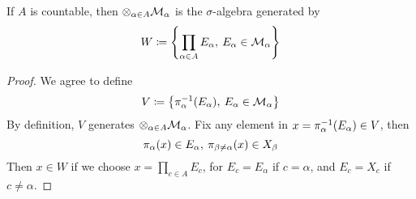 \documentclass[../../main.tex]{subfiles}
\begin{document}
\begin{wts}
    If $A$ is countable, then $\otimes_{\alpha\in A}\cal{M}_\alpha$ is the $\sigma$-algebra generated by 
    \[
    W\defined\left\{\prod_{\alpha\in A} E_\alpha,\: E_\alpha\in\cal{M}_\alpha\right\}
    \]
\end{wts}
\begin{proof}
We agree to define 
\[
V\defined\left\{\pnv{\alpha}{E_\alpha},\:E_\alpha\in\cal{M}_\alpha\right\}
\]
By definition, $V$ generates $\otimes_{\alpha\in A}\cal{M}_\alpha$. Fix any element in $x=\pnv{\alpha}{E_\alpha}\in V$, then 
\[
\pmap{\alpha}{x}\in E_\alpha,\:\pmap{\beta\neq\alpha}{x}\in X_\beta
\]
Then $x\in W$ if we choose $x = \prod_{c\in A}E_c$, for $E_c = E_\alpha$ if $c=\alpha$, and $E_c=X_c$ if $c\neq\alpha$.
\end{proof}
\end{document}
